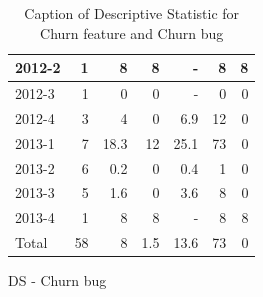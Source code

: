 \documentclass[UKenglish]{ifimaster}  %
\begin{document}
\begin{appendices}
\begin{table}[!htbp]
\begin{adjustwidth}{-1.5cm}{}
\begin{subfigure}[b]{0.3\textwidth}
{\begin{tabular}{ | l | r | r | r | r | r | r | }
 2012-2  & 1 & 8 & 8 & - & 8 & 8 \\ \hline
 2012-3  & 1 & 0 &0 &- & 0 &0\\ \hline
 2012-4  & 3 & 4 & 0 &6.9 & 12 & 0\\ \hline
 2013-1  & 7 & 18.3 & 12 & 25.1 & 73 & 0\\ \hline
 2013-2  & 6 & 0.2 & 0 &0.4 & 1 & 0\\ \hline
 2013-3  & 5 & 1.6 & 0 &3.6 & 8 & 0\\ \hline
 2013-4  & 1 & 8 & 8 & - & 8 & 8 \\ \hline
 Total  & 58 & 8 & 1.5 & 13.6 & 73 & 0\\ \hline
\end{tabular}
}
\caption{DS - Churn bug}
 \label{DS:CB:8}
\end{subfigure}
\end{adjustwidth}
\caption[Optional caption for list of figures]{Caption of Descriptive Statistic for Churn feature and Churn bug}
\label{DS:8:4} %
\end{table}




\end{appendices}
\end{document}

